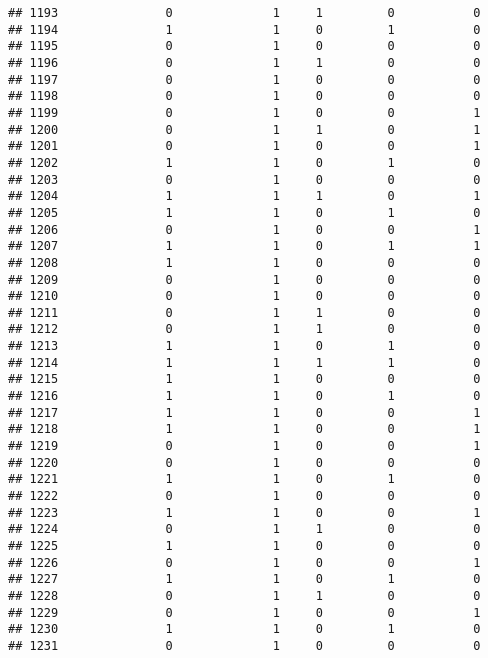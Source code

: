 \documentclass[]{article}
\begin{document}
\begin{verbatim}
## 1193               0              1     1         0           0
## 1194               1              1     0         1           0
## 1195               0              1     0         0           0
## 1196               0              1     1         0           0
## 1197               0              1     0         0           0
## 1198               0              1     0         0           0
## 1199               0              1     0         0           1
## 1200               0              1     1         0           1
## 1201               0              1     0         0           1
## 1202               1              1     0         1           0
## 1203               0              1     0         0           0
## 1204               1              1     1         0           1
## 1205               1              1     0         1           0
## 1206               0              1     0         0           1
## 1207               1              1     0         1           1
## 1208               1              1     0         0           0
## 1209               0              1     0         0           0
## 1210               0              1     0         0           0
## 1211               0              1     1         0           0
## 1212               0              1     1         0           0
## 1213               1              1     0         1           0
## 1214               1              1     1         1           0
## 1215               1              1     0         0           0
## 1216               1              1     0         1           0
## 1217               1              1     0         0           1
## 1218               1              1     0         0           1
## 1219               0              1     0         0           1
## 1220               0              1     0         0           0
## 1221               1              1     0         1           0
## 1222               0              1     0         0           0
## 1223               1              1     0         0           1
## 1224               0              1     1         0           0
## 1225               1              1     0         0           0
## 1226               0              1     0         0           1
## 1227               1              1     0         1           0
## 1228               0              1     1         0           0
## 1229               0              1     0         0           1
## 1230               1              1     0         1           0
## 1231               0              1     0         0           0

\end{verbatim}
\end{document}
